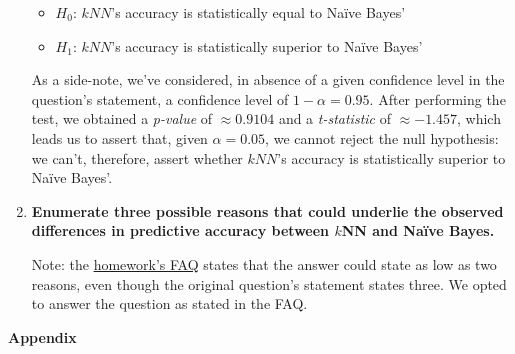\documentclass[12pt]{article}
\begin{document}
\begin{enumerate}[leftmargin=\labelsep,resume]
  \begin{itemize}
    \item $H_0$: $kNN$'s accuracy is statistically equal to Naïve Bayes'
    \item $H_1$: $kNN$'s accuracy is statistically superior to Naïve Bayes'
  \end{itemize}

  As a side-note, we've considered, in absence of a given confidence level in the
  question's statement, a confidence level of $1 - \alpha = 0.95$.
  After performing the test, we obtained a \textit{p-value} of $\approx 0.9104$ and
  a \textit{t-statistic} of $\approx -1.457$, which leads us to assert that, given
  $\alpha = 0.05$, we cannot reject the null hypothesis: we can't, therefore,
  assert whether $kNN$'s accuracy is statistically superior to Naïve Bayes'.
   
  \item \textbf{Enumerate three possible reasons that could underlie the observed differences in predictive
  accuracy between $k$NN and Naïve Bayes.}

  Note: the \href{https://fenix.tecnico.ulisboa.pt/disciplinas/Apre2/2022-2023/1-semestre/homeworks}{homework's FAQ}
  states that the answer could state as low as two reasons, even though the original
  question's statement states three. We opted to answer the question as stated in
  the FAQ.
  
\end{enumerate}

\pagebreak

\large{\textbf{Appendix}\vskip 0.3cm}


% 
\end{document}
